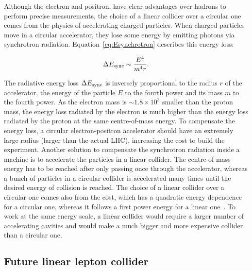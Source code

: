     Although the electron and positron, have clear advantages over hadrons to perform precise measurements, the choice of a linear collider over a circular one comes from the physics of accelerating charged particles.
    When charged particles move in a circular accelerator, they lose some energy by emitting photons via synchrotron radiation.
    Equation~\ref{eq:Esynchrotron} describes this energy loss:
    
    \begin{equation}
     \Delta E_{\rm{sync}} \sim \frac{E^4}{m^4r}.
       \label{eq:Esynchrotron}
    \end{equation} 

    The radiative energy loss $\Delta E_{\rm{sync}}$ is inversely proportional to the radius $r$ of the accelerator, the energy of the particle $E$ to the fourth power and its mass $m$ to the fourth power.
    As the electron mass is $\sim 1.8 \times 10^3$ smaller than the proton mass, the energy loss radiated by the electron is much higher than the energy loss radiated by the proton at the same centre-of-mass energy.
    To compensate the energy loss, a circular electron-positron accelerator should have an extremely large radius (larger than the actual \gls{LHC}), increasing the cost to build the experiment.
    Another solution to compensate the synchrotron radiation inside a machine is to accelerate the particles in a linear collider.
    The centre-of-mass energy has to be reached after only passing once through the accelerator, whereas a bunch of particles in a circular collider is accelerated many times until the desired energy of collision is reached.
    The choice of a linear collider over a circular one comes also from the cost, which has a quadratic energy dependence for a circular one, whereas it follows a first power energy for a linear one~\cite{Richter:1976ug}. 
    To work at the same energy scale, a linear collider would require a larger number of accelerating cavities and would make a much bigger and more expensive collider than a circular one.

    \subsection{Future linear lepton collider}
    
